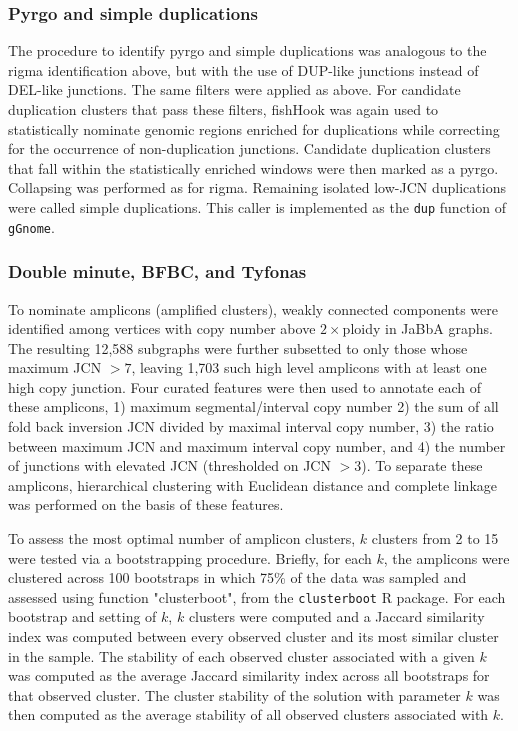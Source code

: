 \documentclass[phd,tocprelim]{cornell}
\newcommand{\ttt}[1]{\texttt{#1}}
\begin{document}
\subsubsection*{Pyrgo and simple duplications}

The procedure to identify pyrgo and simple duplications was analogous to the rigma identification above, but with the use of DUP-like junctions instead of DEL-like junctions. The same filters were applied as above. For candidate duplication clusters that pass these filters, fishHook was again used to statistically nominate genomic regions enriched for duplications while correcting for the occurrence of non-duplication junctions. Candidate duplication clusters that fall within the statistically enriched windows were then marked as a pyrgo. Collapsing was performed as for rigma. Remaining isolated low-JCN duplications were called simple duplications. This caller is implemented as the \ttt{dup} function of \ttt{gGnome}.

\subsubsection*{Double minute, BFBC, and Tyfonas}

To nominate amplicons (amplified clusters), weakly connected components were identified among vertices with copy number above $2\times$ploidy in JaBbA graphs. The resulting 12,588 subgraphs were further subsetted to only those whose maximum JCN $>7$, leaving 1,703 such high level amplicons with at least one high copy junction. Four curated features were then used to annotate each of these amplicons, 1) maximum segmental/interval copy number 2) the sum of all fold back inversion JCN divided by maximal interval copy number, 3) the ratio between maximum JCN and maximum interval copy number, and 4) the number of junctions with elevated JCN (thresholded on JCN $> 3$). To separate these amplicons, hierarchical clustering with Euclidean distance and complete linkage was performed on the basis of these features. 
 

To assess the most optimal number of amplicon clusters, $k$ clusters from 2 to 15 were tested via a bootstrapping procedure.   Briefly, for each $k$, the amplicons were clustered across 100 bootstraps in which 75\% of the data was sampled and assessed using function "clusterboot", from the \texttt{clusterboot} R package. For each bootstrap and setting of $k$, $k$ clusters were computed and a Jaccard similarity index was computed between every observed cluster and its most similar cluster in the sample.  The stability of each observed cluster associated with a given $k$ was computed as the average Jaccard similarity index across all bootstraps for that observed cluster.  The cluster stability of the solution with parameter $k$ was then computed as the average stability of all observed clusters associated with $k$.  
\end{document}
